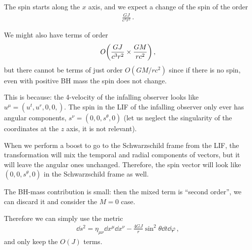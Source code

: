 \documentclass[main.tex]{subfiles}
\begin{document}
The spin starts along the \(x\) axis, and we expect a change of the spin of the order 
%
\begin{align}
  \frac{GJ}{c^3r^2}
\,.
\end{align}

We might also have terms of order 
%
\begin{align}
  O \qty(\frac{GJ}{c^3r^2} \times \frac{GM}{rc^2 })
\,,
\end{align}
%
but there cannot be terms of just order \(O(GM/rc^2)\) since if there is no spin, even with positive BH mass the spin does not change. 

\begin{bluebox}
  This is because: the 4-velocity of the infalling observer looks like \(u^{\mu } = (u^{t}, u^{r}, 0,0,)\). The spin in the LIF of the infalling observer only ever has angular components, \(s^{\nu } = (0,0,s^{\theta }, 0)\) (let us neglect the singularity of the coordinates at the \(z\) axis, it is not relevant).
  
  When we perform a boost to go to the Schwarzschild frame from the LIF, the transformation will mix the temporal and radial components of vectors, but it will leave the angular ones unchanged. Therefore, the spin vector will look like \((0,0, s^{\theta }, 0 )\) in the Schwarzschild frame as well.
\end{bluebox}

The BH-mass contribution is small: then the mixed term is ``second order'', we can discard it and consider the \(M=0\) case. 

Therefore we can simply use the metric 
%
\begin{align}
  \dd{s^2} = \eta_{\mu \nu } \dd{x^{\mu }} \dd{x^{\nu }}
  - \frac{4GJ}{r} \sin^2 \theta \dd{t} \dd{\varphi }
\,,
\end{align}
%
and only keep the \(O(J)\) terms. 
\end{document}
